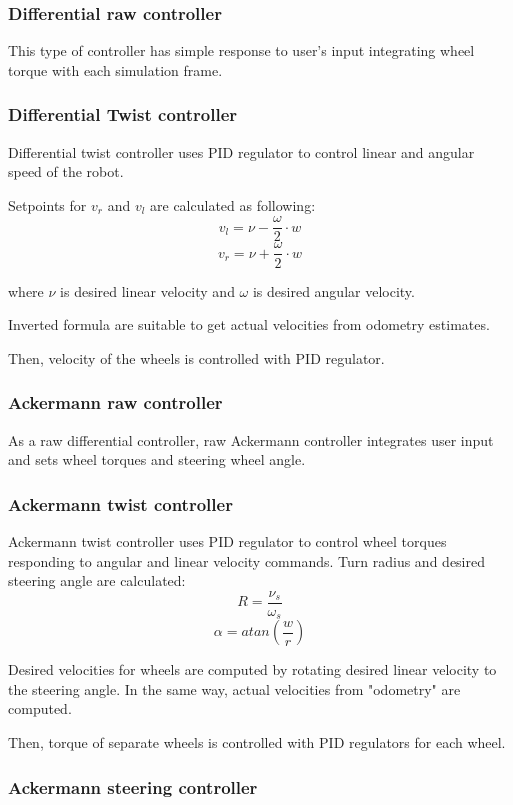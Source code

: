 \documentclass[a4paper,11pt]{article}
\begin{document}
\subsubsection{Differential raw controller}

This type of controller has simple response to user's input integrating wheel torque with each simulation frame.

\subsubsection{Differential Twist controller}

Differential twist controller uses PID regulator to control linear and angular speed of the robot. 

Setpoints for $v_r$ and $v_l$ are calculated as following:
$$
v_l = \nu - \frac{\omega}{2} \cdot w
$$
$$
v_r = \nu + \frac{\omega}{2} \cdot w
$$

where $\nu$ is desired linear velocity and $\omega$ is desired angular velocity.


Inverted formula are suitable to get actual velocities from odometry estimates.


Then, velocity of the wheels is controlled with PID regulator.

\subsubsection{Ackermann raw controller}

As a raw differential controller, raw Ackermann controller integrates user input and sets wheel torques and steering wheel angle.

\subsubsection{Ackermann twist controller}

Ackermann twist controller uses PID regulator to control wheel torques responding to angular and linear velocity commands. 
Turn radius and desired steering angle are calculated: 
$$
R = \frac{\nu_s}{\omega_s}
$$
$$
\alpha = atan(\frac{w}{r})
$$

Desired velocities for wheels are computed by rotating desired linear velocity to the steering angle. 
In the same way, actual velocities from "odometry" are computed.

Then, torque of separate wheels is controlled with PID regulators for each wheel.

\subsubsection{Ackermann steering controller}
\end{document}
